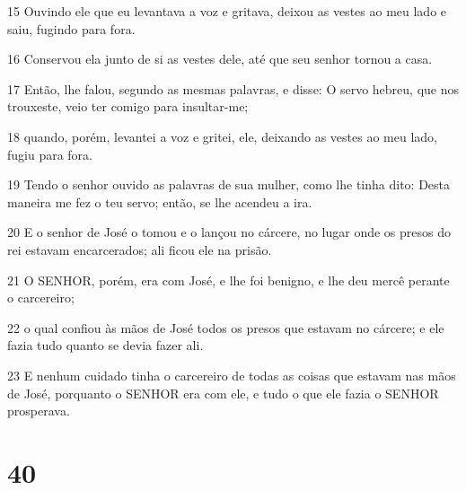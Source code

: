 \par 15 Ouvindo ele que eu levantava a voz e gritava, deixou as vestes ao meu lado e saiu, fugindo para fora.
\par 16 Conservou ela junto de si as vestes dele, até que seu senhor tornou a casa.
\par 17 Então, lhe falou, segundo as mesmas palavras, e disse: O servo hebreu, que nos trouxeste, veio ter comigo para insultar-me;
\par 18 quando, porém, levantei a voz e gritei, ele, deixando as vestes ao meu lado, fugiu para fora.
\par 19 Tendo o senhor ouvido as palavras de sua mulher, como lhe tinha dito: Desta maneira me fez o teu servo; então, se lhe acendeu a ira.
\par 20 E o senhor de José o tomou e o lançou no cárcere, no lugar onde os presos do rei estavam encarcerados; ali ficou ele na prisão.
\par 21 O SENHOR, porém, era com José, e lhe foi benigno, e lhe deu mercê perante o carcereiro;
\par 22 o qual confiou às mãos de José todos os presos que estavam no cárcere; e ele fazia tudo quanto se devia fazer ali.
\par 23 E nenhum cuidado tinha o carcereiro de todas as coisas que estavam nas mãos de José, porquanto o SENHOR era com ele, e tudo o que ele fazia o SENHOR prosperava.

\chapter{40}

